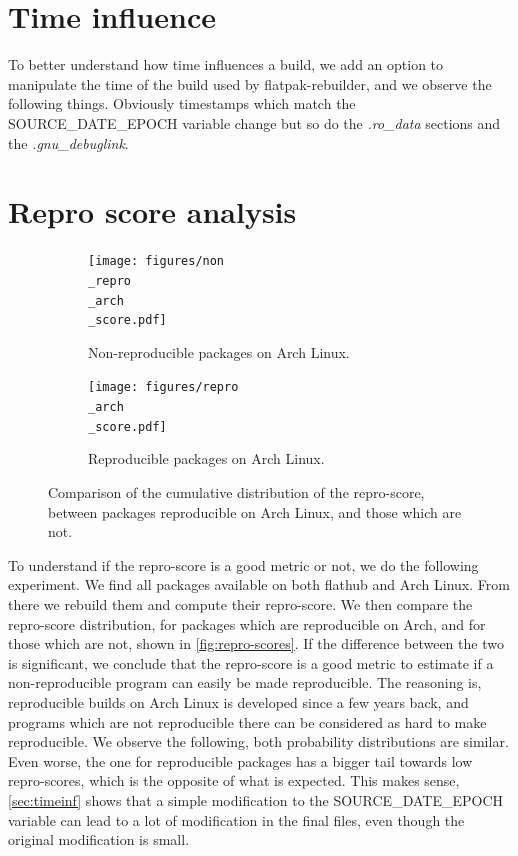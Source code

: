 \documentclass[a4paper,11pt,oneside]{report}
\theoremstyle{definition}
\newcommand{\sysname}{flatpak-rebuilder\xspace}
\newcommand{\rb}{reproducible builds\xspace}
\newcommand{\fh}{flathub\xspace}
\newcommand{\sde}{SOURCE\_DATE\_EPOCH\xspace}
\begin{document}
\section*{Time influence}
\label{sec:timeinf}
To better understand how time influences a build, we add an option to manipulate
the time of the build used by \sysname, and we observe the following things.
Obviously timestamps which match the \sde variable change but so do the
\emph{.ro\_data} sections and the \emph{.gnu\_debuglink}.

\section{Repro score analysis}

\begin{figure}[h]
\centering
\begin{subfigure}{.5\textwidth}
  \centering
  \texttt{[image: figures/non\\\_repro\\\_arch\\\_score.pdf]}
  \caption{Non-reproducible packages on Arch Linux.}
  \label{fig:sub1}
\end{subfigure}%
\begin{subfigure}{.5\textwidth}
  \centering
  \texttt{[image: figures/repro\\\_arch\\\_score.pdf]}
  \caption{Reproducible packages on Arch Linux.}
  \label{fig:sub2}
\end{subfigure}
\caption{Comparison of the cumulative distribution of the repro-score, between
    packages reproducible on Arch Linux, and those which are not.}
\label{fig:repro-scores}
\end{figure}

To understand if the repro-score is a good metric or not, we do the following
experiment. We find all packages available on both \fh and Arch Linux. From
there we rebuild them and compute their repro-score. We then compare the
repro-score distribution, for packages which are reproducible on Arch, and for
those which are not, shown in \autoref{fig:repro-scores}. If the difference
between the two is significant, we conclude that the repro-score is a good
metric to estimate if a non-reproducible program can easily be made
reproducible. The reasoning is, \rb on Arch Linux is developed since a few
years back, and programs which are not reproducible there can be considered as
hard to make reproducible. We observe the following, both probability
distributions are similar. Even worse, the one for reproducible packages has a
bigger tail towards low repro-scores, which is the opposite of what is
expected.  This makes sense, \autoref{sec:timeinf} shows that a simple
modification to the \sde variable can lead to a lot of modification in the
final files, even though the original modification is small.
\end{document}

